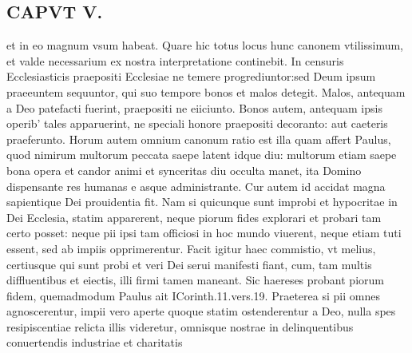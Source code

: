 \documentclass{article}
\begin{document}
\begin{pages}
\section*{CAPVT V. }
\marginpar{[ p.385 ]}\pstart et in eo magnum vsum habeat. Quare hic totus locus hunc canonem vtilissimum, et valde necessarium ex nostra interpretatione continebit. In censuris Ecclesiasticis praepositi Ecclesiae ne temere progrediuntor:sed Deum ipsum praeeuntem sequuntor, qui suo tempore bonos et malos detegit. Malos, antequam a Deo patefacti fuerint, praepositi ne eiiciunto. Bonos autem, antequam ipsis operib' tales apparuerint, ne speciali honore praepositi decoranto: aut caeteris praeferunto. Horum autem omnium canonum ratio est illa quam affert Paulus, quod nimirum multorum peccata saepe latent idque diu: multorum etiam saepe bona opera et candor animi et synceritas diu occulta manet, ita Domino dispensante res humanas e asque administrante.  Cur autem id accidat magna sapientique Dei prouidentia fit. Nam si quicunque sunt improbi et hypocritae in Dei Ecclesia, statim apparerent, neque piorum fides explorari et probari tam certo posset: neque pii ipsi tam officiosi in hoc mundo viuerent, neque etiam tuti essent, sed ab impiis opprimerentur. Facit igitur haec commistio, vt melius, certiusque qui sunt probi et veri Dei serui manifesti fiant, cum, tam multis diffluentibus et eiectis, illi firmi tamen maneant. Sic haereses probant piorum fidem, quemadmodum Paulus ait ICorinth.11.vers.19. Praeterea si pii omnes agnoscerentur, impii vero aperte quoque statim ostenderentur a Deo, nulla spes resipiscentiae relicta illis videretur, omnisque nostrae in delinquentibus conuertendis industriae et charitatis  \pend

\end{pages}
\end{document}
